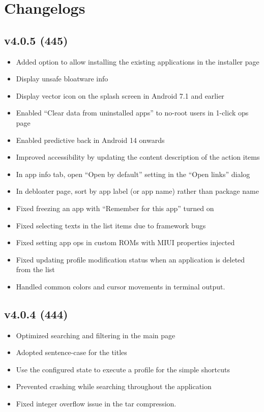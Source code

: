 \chapter{Changelogs}\label{ch:changelogs} %

\section{v4.0.5 (445)}\label{sec:v4.0.5-(445)}
\begin{itemize}
    \item Added option to allow installing the existing applications in the installer page
    \item Display unsafe bloatware info
    \item Display vector icon on the splash screen in Android 7.1 and earlier
    \item Enabled ``Clear data from uninstalled apps'' to no-root users in 1-click ops page
    \item Enabled predictive back in Android 14 onwards
    \item Improved accessibility by updating the content description of the action items
    \item In app info tab, open ``Open by default'' setting in the ``Open links'' dialog
    \item In debloater page, sort by app label (or app name) rather than package name
    \item Fixed freezing an app with ``Remember for this app'' turned on
    \item Fixed selecting texts in the list items due to framework bugs
    \item Fixed setting app ops in custom ROMs with MIUI properties injected
    \item Fixed updating profile modification status when an application is deleted from the list
    \item Handled common colors and cursor movements in terminal output.
\end{itemize}

\section{v4.0.4 (444)}\label{sec:v4.0.4-(444)}
\begin{itemize}
    \item Optimized searching and filtering in the main page
    \item Adopted sentence-case for the titles
    \item Use the configured state to execute a profile for the simple shortcuts
    \item Prevented crashing while searching throughout the application
    \item Fixed integer overflow issue in the tar compression.
\end{itemize}

